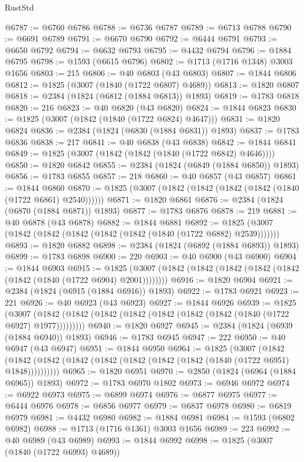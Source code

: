 \begin{lexlean}{RustStd}
\begin{coremodule}
@6787 := @6760 @6786
@6788 := @6736 @6787
@6789 := @6713 @6788
@6790 := @6691 @6789
@6791 := @6670 @6790
@6792 := @6444 @6791
@6793 := @6650 @6792
@6794 := @6632 @6793
@6795 := @4432 @6794
@6796 := @1884 @6795
@6798 := @1593 (@6615 @6796)
@6802 := @1713 (@1716 @1348) @3003 @1656
@6803 := 215
@6806 := @40 @6803 (@43 @6803)
@6807 := @1844 @6806
@6812 := @1825 (@3007 (@1840 (@1722 @6807) @4689))
@6813 := @1820 @6807
@6818 := @2384 (@1824 (@6812 (@1884 @6813)) @1893)
@6819 := @1783 @6818
@6820 := 216
@6823 := @40 @6820 (@43 @6820)
@6824 := @1844 @6823
@6830 := @1825 (@3007 (@1842 (@1840 (@1722 @6824) @4647)))
@6831 := @1820 @6824
@6836 := @2384 (@1824 (@6830 (@1884 @6831)) @1893)
@6837 := @1783 @6836
@6838 := 217
@6841 := @40 @6838 (@43 @6838)
@6842 := @1844 @6841
@6849 := @1825 (@3007 (@1842 (@1842 (@1840 (@1722 @6842) @4646))))
@6850 := @1820 @6842
@6855 := @2384 (@1824 (@6849 (@1884 @6850)) @1893)
@6856 := @1783 @6855
@6857 := 218
@6860 := @40 @6857 (@43 @6857)
@6861 := @1844 @6860
@6870 := @1825 (@3007 (@1842 (@1842 (@1842 (@1842 (@1840 (@1722 @6861) @2540))))))
@6871 := @1820 @6861
@6876 := @2384 (@1824 (@6870 (@1884 @6871)) @1893)
@6877 := @1783 @6876
@6878 := 219
@6881 := @40 @6878 (@43 @6878)
@6882 := @1844 @6881
@6892 := @1825 (@3007 (@1842 (@1842 (@1842 (@1842 (@1842 (@1840 (@1722 @6882) @2539)))))))
@6893 := @1820 @6882
@6898 := @2384 (@1824 (@6892 (@1884 @6893)) @1893)
@6899 := @1783 @6898
@6900 := 220
@6903 := @40 @6900 (@43 @6900)
@6904 := @1844 @6903
@6915 := @1825 (@3007 (@1842 (@1842 (@1842 (@1842 (@1842 (@1842 (@1840 (@1722 @6904) @2001))))))))
@6916 := @1820 @6904
@6921 := @2384 (@1824 (@6915 (@1884 @6916)) @1893)
@6922 := @1783 @6921
@6923 := 221
@6926 := @40 @6923 (@43 @6923)
@6927 := @1844 @6926
@6939 := @1825
    (@3007 (@1842 (@1842 (@1842 (@1842 (@1842 (@1842 (@1842 (@1840 (@1722 @6927) @1977)))))))))
@6940 := @1820 @6927
@6945 := @2384 (@1824 (@6939 (@1884 @6940)) @1893)
@6946 := @1783 @6945
@6947 := 222
@6950 := @40 @6947 (@43 @6947)
@6951 := @1844 @6950
@6964 := @1825
    (@3007
      (@1842 (@1842 (@1842 (@1842 (@1842 (@1842 (@1842 (@1842 (@1840 (@1722 @6951) @1848))))))))))
@6965 := @1820 @6951
@6970 := @2850 (@1824 (@6964 (@1884 @6965)) @1893)
@6972 := @1783 @6970 @1802
@6973 := @6946 @6972
@6974 := @6922 @6973
@6975 := @6899 @6974
@6976 := @6877 @6975
@6977 := @6444 @6976
@6978 := @6856 @6977
@6979 := @6837 @6978
@6980 := @6819 @6979
@6981 := @4432 @6980
@6982 := @1884 @6981
@6984 := @1593 (@6802 @6982)
@6988 := @1713 (@1716 @1361) @3003 @1656
@6989 := 223
@6992 := @40 @6989 (@43 @6989)
@6993 := @1844 @6992
@6998 := @1825 (@3007 (@1840 (@1722 @6993) @4689))

\end{coremodule}
\end{lexlean}
